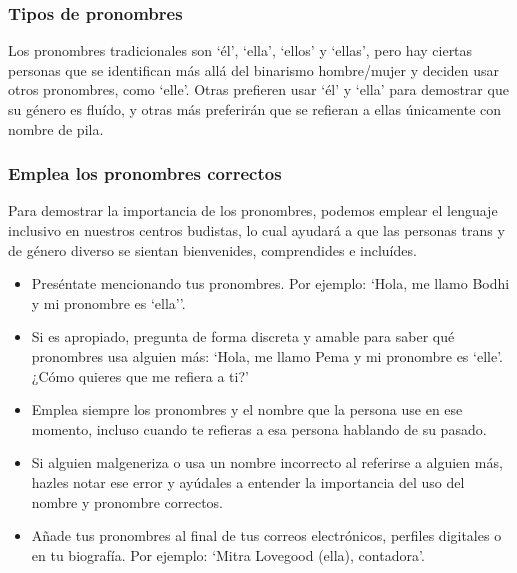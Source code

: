 \documentclass[12pt,openany]{book}
\begin{document}
\subsubsection*{Tipos de pronombres}

Los pronombres tradicionales son `él', `ella', `ellos' y `ellas', pero hay ciertas personas que se identifican más allá del binarismo hombre/mujer y deciden usar otros pronombres, como `elle'. Otras prefieren usar `él' y `ella' para demostrar que su género es fluído, y otras más preferirán que se refieran a ellas únicamente con nombre de pila.

\subsubsection*{Emplea los pronombres correctos}

Para demostrar la importancia de los pronombres, podemos emplear el lenguaje inclusivo en nuestros centros budistas, lo cual ayudará a que las personas trans y de género diverso se sientan bienvenides, comprendides e incluídes.

\begin{itemize}
\setlength\itemsep{-0.3em}
\item Preséntate mencionando tus pronombres. Por ejemplo: `Hola, me llamo Bodhi y mi pronombre es ‘ella’'.
\item Si es apropiado, pregunta de forma discreta y amable para saber qué pronombres usa alguien más: `Hola, me llamo Pema y mi pronombre es ‘elle’. ¿Cómo quieres que me refiera a ti?'
\item Emplea siempre los pronombres y el nombre que la persona use en ese momento, incluso cuando te refieras a esa persona hablando de su pasado.
\item Si alguien malgeneriza o usa un nombre incorrecto al referirse a alguien más, hazles notar ese error y ayúdales a entender la importancia del uso del nombre y pronombre correctos.
\item Añade tus pronombres al final de tus correos electrónicos, perfiles digitales o en tu biografía. Por ejemplo: `Mitra Lovegood (ella), contadora'.
\end{itemize}\begin{figure}[h]
    \centering
\end{figure}
\end{document}
